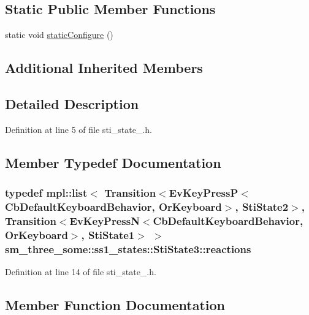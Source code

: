 \subsection*{Static Public Member Functions}
\begin{DoxyCompactItemize}
\item 
static void \hyperlink{structsm__three__some_1_1ss1__states_1_1StiState3_aed371e314b0763d4f1f5831a292ea60c}{static\+Configure} ()
\end{DoxyCompactItemize}
\subsection*{Additional Inherited Members}


\subsection{Detailed Description}


Definition at line 5 of file sti\+\_\+state\+\_.\+h.



\subsection{Member Typedef Documentation}
\subsubsection[{\texorpdfstring{reactions}{reactions}}]{\setlength{\rightskip}{0pt plus 5cm}typedef mpl\+::list$<$ Transition$<$Ev\+Key\+PressP$<$Cb\+Default\+Keyboard\+Behavior, {\bf Or\+Keyboard}$>$, {\bf Sti\+State2}$>$, Transition$<$Ev\+Key\+PressN$<$Cb\+Default\+Keyboard\+Behavior, {\bf Or\+Keyboard}$>$, {\bf Sti\+State1}$>$ $>$ {\bf sm\+\_\+three\+\_\+some\+::ss1\+\_\+states\+::\+Sti\+State3\+::reactions}}\hypertarget{structsm__three__some_1_1ss1__states_1_1StiState3_a2672f9f53573401ff5b62b95bf4d7b47}{}\label{structsm__three__some_1_1ss1__states_1_1StiState3_a2672f9f53573401ff5b62b95bf4d7b47}


Definition at line 14 of file sti\+\_\+state\+\_.\+h.



\subsection{Member Function Documentation}
